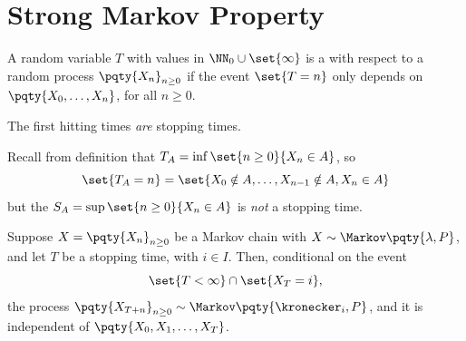 \section{Strong Markov Property}

\begin{definition}
    A random variable \(T\) with values in \(\NN_0 \cup \set{\infty}\) is a  with respect to a random process \(\pqty{X_n}_{n \geq 0}\) if the event \(\set{T = n}\) only depends on \(\pqty{X_0, \ldots, X_n}\), for all \(n \geq 0\).
\end{definition}

\begin{example}
    The first hitting times \emph{are} stopping times.

    Recall from definition that \(T_A = \inf\set{n \geq 0}{X_n \in A}\), so
    \[
        \set{T_A = n} = \set{X_0 \notin A, \ldots, X_{n - 1} \notin A, X_n \in A}
    \]
    but the  \(S_A = \sup \set{n \geq 0}{X_n \in A}\) is \emph{not} a stopping time.
\end{example}

\begin{theorem}
    Suppose \(X = \pqty{X_n}_{n \geq 0}\) be a Markov chain with \(X \sim \Markov\pqty{\lambda, P}\), and let \(T\) be a stopping time, with \(i \in I\). Then, conditional on the event
    \[
        \set{T < \infty} \cap \set{X_T = i},
    \]
    the process \(\pqty{X_{T + n}}_{n \geq 0} \sim \Markov\pqty{\kronecker_i, P}\), and it is independent of \(\pqty{X_0, X_1, \ldots, X_T}\).
\end{theorem}


